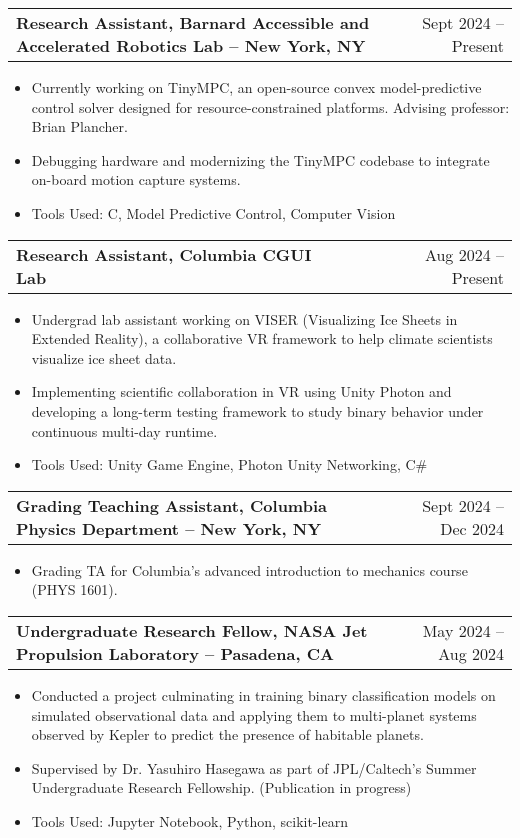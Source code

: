 \documentclass[a4paper,12pt]{article}
\makeatletter
\newenvironment{joblong}[2]
    {
    \begin{tabularx}{\linewidth}{@{}l X r@{}}
    \textbf{#1} & \hfill &  #2 \\[3.75pt]
    \end{tabularx}
    \begin{minipage}[t]{\linewidth}
    \begin{itemize}[nosep,after=\strut, leftmargin=1em, itemsep=3pt,label=--]
    }
    {
    \end{itemize}
    \end{minipage}    
    }
\makeatother
\begin{document}
\begin{joblong}{Research Assistant, Barnard Accessible and Accelerated Robotics Lab -- New York, NY}{Sept 2024 -- Present}
\item Currently working on TinyMPC, an open-source convex model-predictive control solver designed for resource-constrained platforms. Advising professor: Brian Plancher.
\item Debugging hardware and modernizing the TinyMPC codebase to integrate on-board motion capture systems.
\item Tools Used: C, Model Predictive Control, Computer Vision
\end{joblong}

\begin{joblong}{Research Assistant, Columbia CGUI Lab}{Aug 2024 -- Present}
\item Undergrad lab assistant working on VISER (Visualizing Ice Sheets in Extended Reality), a collaborative VR framework to help climate scientists visualize ice sheet data.
\item Implementing scientific collaboration in VR using Unity Photon and developing a long-term testing framework to study binary behavior under continuous multi-day runtime.
\item Tools Used: Unity Game Engine, Photon Unity Networking, C#
\end{joblong}

\begin{joblong}{Grading Teaching Assistant, Columbia Physics Department -- New York, NY}{Sept 2024 -- Dec 2024}
\item Grading TA for Columbia's advanced introduction to mechanics course (PHYS 1601).
\end{joblong}

\begin{joblong}{Undergraduate Research Fellow, NASA Jet Propulsion Laboratory -- Pasadena, CA}{May 2024 -- Aug 2024}
\item Conducted a project culminating in training binary classification models on simulated observational data and applying them to multi-planet systems observed by Kepler to predict the presence of habitable planets.
\item Supervised by Dr. Yasuhiro Hasegawa as part of JPL/Caltech's Summer Undergraduate Research Fellowship. (Publication in progress)
\item Tools Used: Jupyter Notebook, Python, scikit-learn
\end{joblong}
\end{document}
